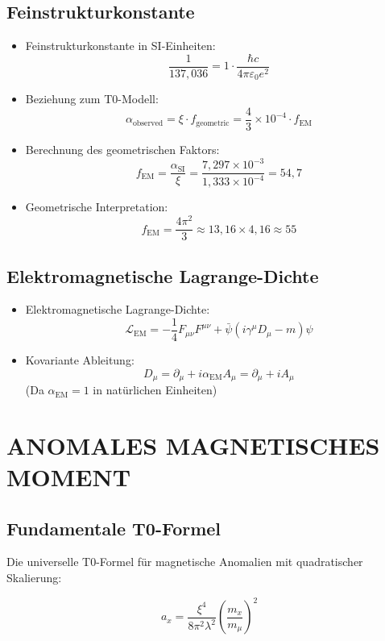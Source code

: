 \documentclass[12pt,a4paper]{article}
\begin{document}
	\subsection{Feinstrukturkonstante}
	\begin{itemize}
		\item Feinstrukturkonstante in SI-Einheiten:
		$$\frac{1}{137{,}036} = 1 \cdot \frac{\hbar c}{4\pi\varepsilon_0 e^2}$$
		
		\item Beziehung zum T0-Modell:
		$$\alpha_{\text{observed}} = \xi \cdot f_{\text{geometric}} = \frac{4}{3} \times 10^{-4} \cdot f_{\text{EM}}$$
		
		\item Berechnung des geometrischen Faktors:
		$$f_{\text{EM}} = \frac{\alpha_{\text{SI}}}{\xi} = \frac{7{,}297 \times 10^{-3}}{1{,}333 \times 10^{-4}} = 54{,}7$$
		
		\item Geometrische Interpretation:
		$$f_{\text{EM}} = \frac{4\pi^2}{3} \approx 13{,}16 \times 4{,}16 \approx 55$$
	\end{itemize}
	
	\subsection{Elektromagnetische Lagrange-Dichte}
	\begin{itemize}
		\item Elektromagnetische Lagrange-Dichte:
		$$\mathcal{L}_{\text{EM}} = -\frac{1}{4}F_{\mu\nu}F^{\mu\nu} + \bar{\psi}(i\gamma^\mu D_\mu - m)\psi$$
		
		\item Kovariante Ableitung:
		$$D_\mu = \partial_\mu + i \alpha_{\text{EM}} A_\mu = \partial_\mu + i A_\mu$$
		(Da $\alpha_{\text{EM}} = 1$ in natürlichen Einheiten)
	\end{itemize}
	
	\section{ANOMALES MAGNETISCHES MOMENT}
	
	\subsection{Fundamentale T0-Formel}
	
	Die universelle T0-Formel für magnetische Anomalien mit quadratischer Skalierung:
	
	\begin{equation}
		\boxed{a_x = \frac{\xi^4}{8\pi^2 \lambda^2} \left(\frac{m_x}{m_\mu}\right)^2}
	\end{equation}
	
\end{document}
